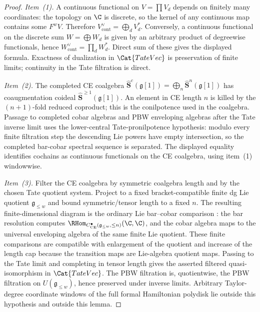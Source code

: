\documentclass[11pt]{memoir}
\begin{document}
\begin{proof}
  \emph{Item~(1).} A continuous functional on $V=\prod V_d$ depends on
  finitely many coordinates: the topology on $\C$ is discrete, so the
  kernel of any continuous map contains some $F^w V$. Therefore
  $V^\vee_{\mathrm{cont}}=\bigoplus_d V_d^*$. Conversely, a continuous
  functional on the discrete sum $W=\bigoplus W_d$ is given by an
  arbitrary product of degreewise functionals, hence
  $W^\vee_{\mathrm{cont}}=\prod_d W_d^*$. Direct sum of these gives the
  displayed formula. Exactness of dualization in $\Cat{TateVec}$ is
  preservation of finite limits; continuity in the Tate filtration is
  direct.

  \emph{Item~(2).} The completed CE coalgebra
  $\widehat{\mathbf S}^c(\mathfrak g[1])=\bigoplus_n
  \widehat{\mathbf S}^n(\mathfrak g[1])$ has coaugmentation coideal
  $\widehat{\mathbf S}^{\geq 1}(\mathfrak g[1])$. An element in CE
  length \(n\) is killed by the \((n+1)\)-fold reduced coproduct; this is
  the conilpotence used in the coalgebra.  Passage to completed cobar
  algebras and PBW enveloping algebras after the Tate inverse limit uses
  the lower-central
  Tate-pronilpotence hypothesis: modulo every finite filtration step the
  descending Lie powers have empty intersection, so the completed
  bar-cobar spectral sequence is separated. The displayed equality
  identifies cochains as continuous functionals on the CE coalgebra,
  using item~(1) windowwise.

  \emph{Item~(3).} Filter the CE coalgebra by symmetric coalgebra
  length and by the chosen Tate quotient system. Project to a fixed
  bracket-compatible finite dg Lie quotient \(\mathfrak g_{\leq w}\) and
  bound symmetric/tensor length to a fixed \(n\). The resulting
  finite-dimensional diagram is the ordinary Lie bar--cobar comparison
  \cite{loday-vallette}: the bar resolution computes
  \(\RHom_{C^\bullet_{\mathrm{CE}}(\mathfrak g_{\leq w},\leq n)}(\C,\C)\),
  and the cobar algebra maps to the universal enveloping algebra of the
  same finite Lie quotient. These finite comparisons are compatible with
  enlargement of the quotient and increase of the length cap because the
  transition maps are Lie-algebra quotient maps. Passing to the Tate
  limit and completing in tensor length gives the asserted filtered
  quasi-isomorphism in \(\Cat{TateVec}\). The PBW filtration is,
  quotientwise, the PBW filtration on
  \(U(\mathfrak g_{\leq w})\), hence preserved under inverse limits.
  Arbitrary Taylor-degree coordinate windows of the full formal
  Hamiltonian polydisk lie outside this hypothesis and outside this lemma.


\end{proof}
\end{document}

